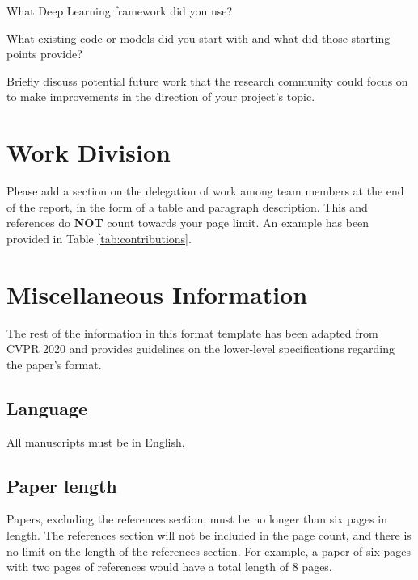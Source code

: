 \documentclass[10pt,twocolumn,letterpaper]{article}
\begin{document}
What Deep Learning framework did you use? 

What existing code or models did you start with and what did those starting points provide? 

Briefly discuss potential future work that the research community could focus on to make improvements in the direction of your project's topic.



\section{Work Division}

Please add a section on the delegation of work among team members at the end of the report, in the form of a table and paragraph description. This and references do \textbf{NOT} count towards your page limit. An example has been provided in Table \ref{tab:contributions}.

\newpage
\newpage
\section{Miscellaneous Information}

The rest of the information in this format template has been adapted from CVPR 2020 and provides guidelines on the lower-level specifications regarding the paper's format.

\subsection{Language}

All manuscripts must be in English.


\subsection{Paper length}
Papers, excluding the references section,
must be no longer than six pages in length. The references section
will not be included in the page count, and there is no limit on the
length of the references section. For example, a paper of six pages
with two pages of references would have a total length of 8 pages.

\end{document}
